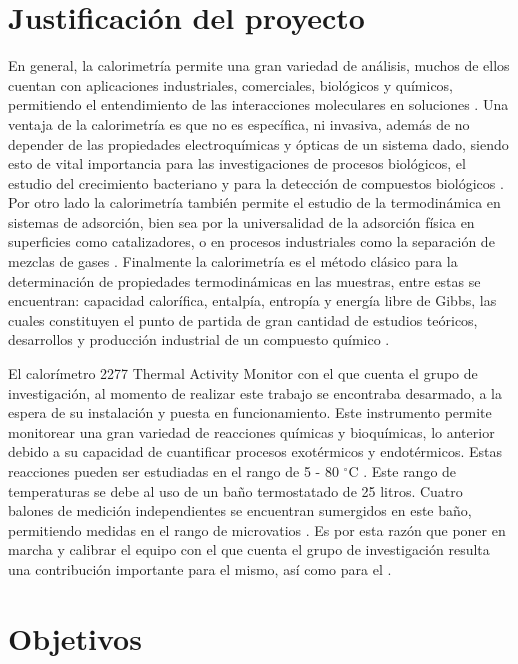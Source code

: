 \section{Justificación del proyecto}
	En general, la calorimetría permite una gran variedad de análisis, muchos de ellos cuentan con aplicaciones industriales, comerciales, biológicos y químicos, permitiendo el entendimiento de las interacciones moleculares en soluciones \cite{blandamer1998titration}. Una ventaja de la calorimetría es que no es específica, ni invasiva, además de no depender de las propiedades electroquímicas y ópticas de un sistema dado, siendo esto de vital importancia para las investigaciones de procesos biológicos, el estudio del crecimiento bacteriano y para la detección de compuestos biológicos \cite{winkelmann2004application}. Por otro lado la calorimetría también permite el estudio de la termodinámica en sistemas de adsorción, bien sea por la universalidad de la adsorción física en superficies como catalizadores, o en procesos industriales como la separación de mezclas de gases \cite{morrison1987calorimetry}. Finalmente la calorimetría es el método clásico para la determinación de propiedades termodinámicas en las muestras, entre estas se encuentran: capacidad calorífica, entalpía, entropía y energía libre de Gibbs, las cuales constituyen el punto de partida de gran cantidad de estudios teóricos, desarrollos y producción industrial de un compuesto químico \cite{wang2005determination, gaisford2016principles}.
	
	El calorímetro 2277 Thermal Activity Monitor con el que cuenta el grupo de investigación, al momento de realizar este trabajo se encontraba desarmado, a la espera de su instalaci\'on y puesta en funcionamiento. Este instrumento permite monitorear una gran variedad de reacciones químicas y bioquímicas, lo anterior debido a su capacidad de cuantificar procesos exotérmicos y endotérmicos. Estas reacciones pueden ser estudiadas en el rango de 5 - 80 $^\circ$C \cite{Suurkuusk}. Este rango de temperaturas se debe al uso de un baño termostatado de 25 litros. Cuatro balones de medición independientes se encuentran sumergidos en este baño, permitiendo medidas en el rango de microvatios \cite{Suurkuusk}. Es por esta razón que poner en marcha y calibrar el equipo con el que cuenta el grupo de investigación resulta una contribución importante para el mismo, así como para el \deptname.
	
\section{Objetivos}
